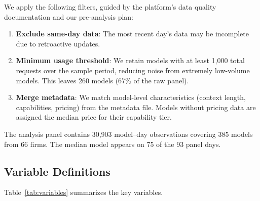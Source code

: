 \documentclass[11pt, a4paper]{article}
\begin{document}
We apply the following filters, guided by the platform's data quality documentation and our pre-analysis plan:

\begin{enumerate}[nosep]
\item \textbf{Exclude same-day data}: The most recent day's data may be incomplete due to retroactive updates.
\item \textbf{Minimum usage threshold}: We retain models with at least 1,000 total requests over the sample period, reducing noise from extremely low-volume models. This leaves 260 models (67\% of the raw panel).
\item \textbf{Merge metadata}: We match model-level characteristics (context length, capabilities, pricing) from the metadata file. Models without pricing data are assigned the median price for their capability tier.
\end{enumerate}

The analysis panel contains 30,903 model--day observations covering 385 models from 66 firms. The median model appears on 75 of the 93 panel days.

\subsection{Variable Definitions}

Table~\ref{tab:variables} summarizes the key variables.
\end{document}
